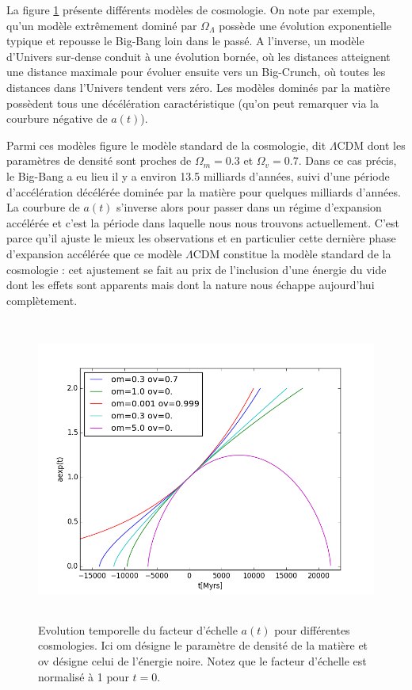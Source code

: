 La figure \ref{f:aexpcosmo} présente différents modèles de cosmologie. On note par exemple, qu'un modèle extrêmement dominé par $\Omega_\Lambda$ possède une évolution exponentielle typique et repousse le Big-Bang loin dans le passé. A l'inverse, un modèle d'Univers sur-dense conduit à une évolution bornée, où les distances atteignent une distance maximale pour évoluer ensuite vers un Big-Crunch, où toutes les distances dans l'Univers tendent vers zéro. Les modèles dominés par la matière possèdent tous une décélération caractéristique (qu'on peut remarquer via la courbure négative de $a(t)$).

Parmi ces modèles figure le modèle standard de la cosmologie, dit $\Lambda$CDM dont les paramètres de densité sont proches de $\Omega_m=0.3$ et $\Omega_v=0.7$.  Dans ce cas précis, le Big-Bang a eu lieu il y a environ 13.5 milliards d'années, suivi d'une période d'accélération décélérée dominée par la matière pour quelques milliards d'années. La courbure de $a(t)$ s'inverse alors pour passer dans un régime d'expansion accélérée et c'est la période dans laquelle nous nous trouvons actuellement.  C'est parce qu'il ajuste le mieux les observations et en particulier cette dernière phase d'expansion accélérée que ce modèle $\Lambda$CDM constitue la modèle standard de la cosmologie : cet ajustement se fait au prix de l'inclusion d'une énergie du vide dont les effets sont apparents mais dont la nature nous échappe aujourd'hui complètement.

\begin{figure}[htbp]
	\centering
		\includegraphics[height=10cm]{figs/a2t_cosmo.png}
	\caption[Facteur d'échelle pour différentes cosmologie]{Evolution temporelle du facteur d'échelle $a(t)$ pour différentes cosmologies. Ici om désigne le paramètre de densité de la matière et ov désigne celui de l'énergie noire. Notez que le facteur d'échelle est normalisé à 1 pour $t=0$.}
	\label{f:aexpcosmo}
\end{figure}

